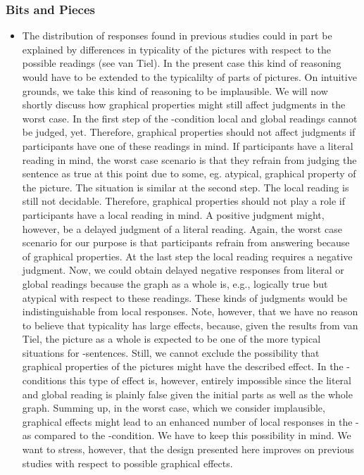 \documentclass[fleqn,reqno,10pt,draft]{article}
\newcommand{\as}{\acro{as}}
\renewcommand{\es}{\acro{es}}
\begin{document}
\subsubsection{Bits and Pieces}
\label{sec:bits-pieces}

\begin{itemize}
\item The distribution of
responses found in previous studies could in part be explained by
differences in typicality of the pictures with respect to the possible
readings (see van Tiel). In the present case this kind of reasoning
would have to be extended to the typicalilty of parts of pictures. On
intuitive grounds, we take this kind of reasoning to be
implausible. We will now shortly discuss how graphical properties
might still affect judgments in the worst case. In the first step of
the \as-condition local and global readings cannot be judged,
yet. Therefore, graphical properties should not affect judgments if
participants have one of these readings in mind. If participants have
a literal reading in mind, the worst case scenario is that they
refrain from judging the sentence as true at this point due to some,
eg. atypical, graphical property of the picture. The situation is
similar at the second step. The local reading is still not
decidable. Therefore, graphical properties should not play a role if
participants have a local reading in mind. A positive judgment might,
however, be a delayed judgment of a literal reading. Again, the worst
case scenario for our purpose is that participants refrain from
answering because of graphical properties. At the last step the local
reading requires a negative judgment. Now, we could obtain delayed
negative responses from literal or global readings because the graph
as a whole is, e.g., logically true but atypical with respect to these
readings. These kinds of judgments would be indistinguishable from
local responses. Note, however, that we have no reason to believe that
typicality has large effects, because, given the results from van
Tiel, the picture as a whole is expected to be one of the more typical
situations for \as-sentences. Still, we cannot exclude the possibility
that graphical properties of the pictures might have the described
effect. In the \es-conditions this type of effect is, however,
entirely impossible since the literal and global reading is plainly
false given the initial parts as well as the whole graph. Summing up,
in the worst case, which we consider implausible, graphical effects
might lead to an enhanced number of local responses in the \as- as
compared to the \es-condition. We have to keep this possibility in
mind. We want to stress, however, that the design presented here
improves on previous studies with respect to possible graphical
effects.
\end{itemize}
\end{document}
